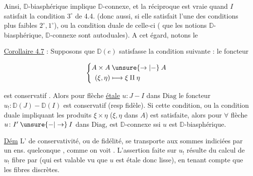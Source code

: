Ainsi, $\mathbb{D}$-biasphérique implique $\mathbb{D}$-connexe, et la réciproque est vraie quand $I$ satisfait  la condition $3^\circ$ de 4.4. (donc aussi, si elle satisfait l'une des conditions plus faibles $2^\circ,1^\circ$), ou la condition duale de celle-ci ( que les notions $\mathbb{D}$-biasphérique, $\mathbb{D}$-connexe sont autoduales). A cet égard, notons le

\uline{Corollaire 4.7} : Supposons que $\mathbb{D}(e)$ satisfasse la condition suivante : le foncteur


\[
 \left\{\begin{aligned}
 A\times A&\mathbin{\unsure{\to|-}}A\\
 (\xi,\eta)&\longmapsto \xi\amalg\eta
 \end{aligned}\right.
\]

est conservatif . Alors pour  flèche \uline{étale} $u\colon J\mathbin{-}I$ dans $\mathrm{Diag}$  le foncteur $u_!\colon\mathbb{D}(J)\mathbin{-}\mathbb{D}(I)$ est conservatif (resp fidèle). Si cette condition, ou la condition duale
impliquant les produits $\xi\times\eta$ ($\xi,\eta$ dans $A$) est satisfaite, alors pour $\forall$ flèche $u\colon I'\mathbin{\unsure{-|\to}}I$ dans $\mathrm{Diag}$,  est $\mathbb{D}$-connexe ssi $u$ est $\mathbb{D}$-biasphérique.

\uline{Dém} L' de conservativité, ou de fidélité, se transporte aux sommes indiciées par un ens.  quelconque , comme on voit . L'assertion faite sur $u_!$ résulte  du calcul de $u_!$ fibre par  (qui est valable vu que $u$ est étale donc lisse), en tenant compte que les fibres  discrètes.

